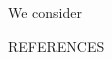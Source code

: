\documentclass[12pt,a4paper,twoside]{article}  %
\makeatletter
\def\refereng{\begin{otherlanguage}{english}\vspace{20pt}  \par \small  \noindent \referateng\par\vspace{3ex}\@fundingeng\par\end{otherlanguage}}
\newcommand{\referateng}{We consider }
\makeatother
\begin{document}
		\refereng
		
		
		
		
		\begin{center}
			REFERENCES
		\end{center}
		\setlength{\leftmargini}{1.8em}
\end{document}

